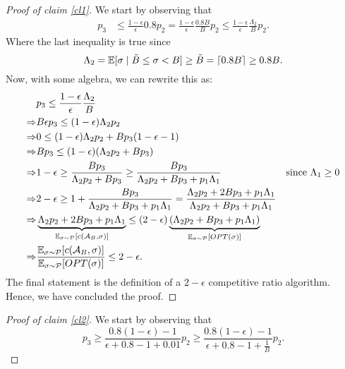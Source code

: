 \documentclass[11pt]{article}
\begin{document}
\begin{enumerate}
    \begin{proof}[Proof of claim \ref{cl1}]
        We start by observing that
        \begin{align*}
            p_3 &\leq \frac{1-\epsilon}{\epsilon} 0.8 p_2 = \frac{1-\epsilon}{\epsilon} \frac{0.8B}{B} p_2 \leq \frac{1-\epsilon}{\epsilon} \frac{\Lambda_2}{B} p_2.
        \end{align*}
        Where the last inequality is true since
        \begin{equation*}
            \Lambda_2 = \mathbb{E}[\sigma \mid \tilde B \leq \sigma <  B] \geq \tilde B = \lceil0.8B \rceil \geq 0.8B.
        \end{equation*}
        Now, with some algebra, we can rewrite this as:
        \begin{align*}
            & p_3 \leq \frac{1-\epsilon}{\epsilon} \frac{\Lambda_2}{B}\\
            \Rightarrow & B \epsilon p_3 \leq (1-\epsilon)\Lambda_2
            p_2\\
            \Rightarrow & 0 \leq (1-\epsilon)\Lambda_2
            p_2 + Bp_3(1-\epsilon - 1)\\
            \Rightarrow & Bp_3 \leq (1-\epsilon)(\Lambda_2p_2 + Bp_3)\\
            \Rightarrow & 1-\epsilon \geq \frac{Bp_3}{\Lambda_2p_2 + Bp_3} \geq \frac{Bp_3}{\Lambda_2p_2 + Bp_3 + p_1 \Lambda_1}&\text{since $\Lambda_1 \geq 0$}\\
            \Rightarrow & 2-\epsilon \geq 1 + \frac{Bp_3}{\Lambda_2p_2 + Bp_3 + p_1 \Lambda_1} = \frac{\Lambda_2p_2 + 2Bp_3 + p_1 \Lambda_1}{\Lambda_2p_2 + Bp_3 + p_1 \Lambda_1}\\
            \Rightarrow & \underbrace{\Lambda_2p_2 + 2Bp_3 + p_1 \Lambda_1}_{\mathbb{E}_{\sigma \sim \mathcal{P}}[c(\mathcal{A}_B, \sigma)]} \leq (2-\epsilon)\underbrace{(\Lambda_2p_2 + Bp_3 + p_1 \Lambda_1)}_{\mathbb{E}_{\sigma \sim \mathcal{P}}[OPT(\sigma)]}\\
            \Rightarrow & \frac{\mathbb{E}_{\sigma \sim \mathcal{P}}[c(\mathcal{A}_B, \sigma)]}{\mathbb{E}_{\sigma \sim \mathcal{P}}[OPT(\sigma)]} \leq 2-\epsilon.
        \end{align*}
        The final statement is the definition of a $2-\epsilon$ competitive ratio algorithm. Hence, we have concluded the proof. 
    \end{proof}    
    \begin{proof}[Proof of claim \ref{cl2}]
        We start by observing that
        \begin{equation*}
            p_3 \geq \frac{0.8(1-\epsilon)-1}{\epsilon + 0.8 - 1 + 0.01}p_2 \geq \frac{0.8(1-\epsilon)-1}{\epsilon + 0.8 - 1 + \frac{1}{B}}p_2. 

\end{equation*}
\end{proof}
\end{enumerate}
\end{document}

